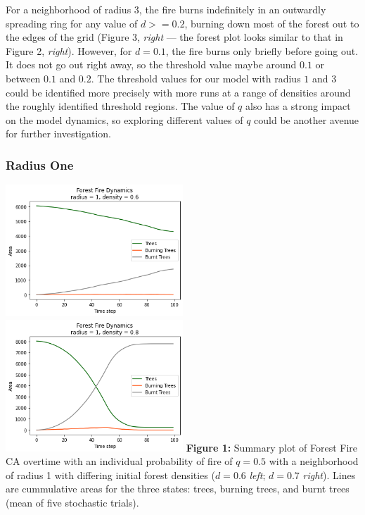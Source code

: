 \documentclass[]{article}
\begin{document}
For a neighborhood of radius \(3\), the fire burns indefinitely in an
outwardly spreading ring for any value of \(d >= 0.2\), burning down
most of the forest out to the edges of the grid (Figure 3, \emph{right}
--- the forest plot looks similar to that in Figure 2, \emph{right}).
However, for \(d = 0.1\), the fire burns only briefly before going out.
It does not go out right away, so the threshold value maybe around
\(0.1\) or between \(0.1\) and \(0.2\). The threshold values for our
model with radius \(1\) and \(3\) could be identified more precisely
with more runs at a range of densities around the roughly identified
threshold regions. The value of \(q\) also has a strong impact on the
model dynamics, so exploring different values of \(q\) could be another
avenue for further investigation.

\hypertarget{radius-one}{%
\subsubsection{Radius One}\label{radius-one}}

\includegraphics[width=0.5\textwidth,height=\textheight]{../plots/r1d6.png}
\includegraphics[width=0.5\textwidth,height=\textheight]{../plots/r1d8.png}
\textbf{Figure 1:} Summary plot of Forest Fire CA overtime with an
individual probability of fire of \(q = 0.5\) with a neighborhood of
radius 1 with differing initial forest densities (\(d = 0.6\)
\emph{left}; \(d = 0.7\) \emph{right}). Lines are cummulative areas for
the three states: trees, burning trees, and burnt trees (mean of five
stochastic trials).
\end{document}
